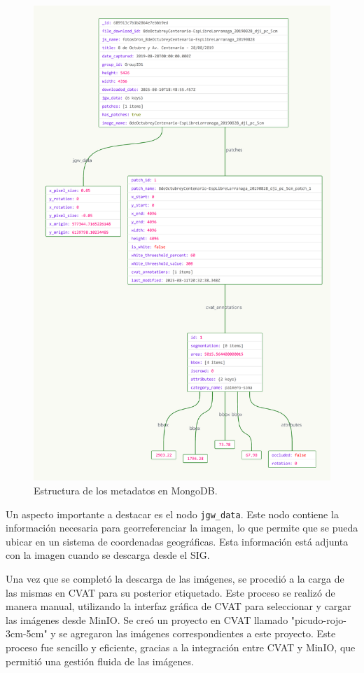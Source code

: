 \begin{figure}[H]
  \centering
  \includegraphics[scale=0.1]{./Figures/metadatos-mongodb.png}
  \caption{Estructura de los metadatos en MongoDB.}
  \label{fig:metadatos-mongodb}
\end{figure}

Un aspecto importante a destacar es el nodo \lstinline[language=sh]|jgw_data|. Este nodo contiene la información necesaria para georreferenciar la imagen, lo que permite que se pueda ubicar en un sistema de coordenadas geográficas. Esta información está adjunta con la imagen cuando se descarga desde el SIG.

Una vez que se completó la descarga de las imágenes, se procedió a la carga de las mismas en CVAT para su posterior etiquetado. Este proceso se realizó de manera manual, utilizando la interfaz gráfica de CVAT para seleccionar y cargar las imágenes desde MinIO. Se creó un proyecto en CVAT llamado "picudo-rojo-3cm-5cm" y se agregaron las imágenes correspondientes a este proyecto. Este proceso fue sencillo y eficiente, gracias a la integración entre CVAT y MinIO, que permitió una gestión fluida de las imágenes.


